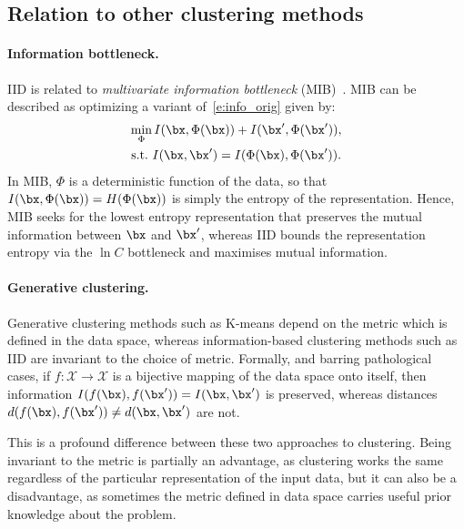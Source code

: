 \subsection{Relation to other clustering methods}\label{s:discuss}

\paragraph{Information bottleneck.}

IID is related to \emph{multivariate information bottleneck} (MIB)~\cite{friedman2001multivariate,wang10information}. MIB can be described as optimizing a variant of~\cref{e:info_orig} given by:
\begin{multline*}
\min_{\Phi} 
I(\bx,\Phi(\bx)) + I(\bx',\Phi(\bx')),
\\
\text{s.t.\ }
I(\bx,\bx') = I(\Phi(\bx),\Phi(\bx')).
\end{multline*}
In MIB, $\Phi$ is a deterministic function of the data, so that $I(\bx,\Phi(\bx))=H(\Phi(\bx))$ is simply the entropy of the representation. Hence, MIB seeks for the lowest entropy representation that preserves the mutual information between $\bx$ and $\bx'$, whereas IID bounds the representation entropy via the $\ln C$ bottleneck and maximises mutual information.

\paragraph{Generative clustering.}

Generative clustering methods such as K-means depend on the metric which is defined in the data space, whereas information-based clustering methods such as IID are invariant to the choice of metric.
Formally, and barring pathological cases, if $f : \mathcal{X}\rightarrow\mathcal{X}$ is a bijective mapping of the data space onto itself, then information $I(f(\bx),f(\bx')) = I(\bx,\bx')$ is preserved, whereas distances $d(f(\bx),f(\bx')) \not= d(\bx,\bx')$ are not.

This is a profound difference between these two approaches to clustering.
Being invariant to the metric is partially an advantage, as clustering works the same regardless of the particular representation of the input data, but it can also be a disadvantage, as sometimes the metric defined in data space carries useful prior knowledge about the problem.